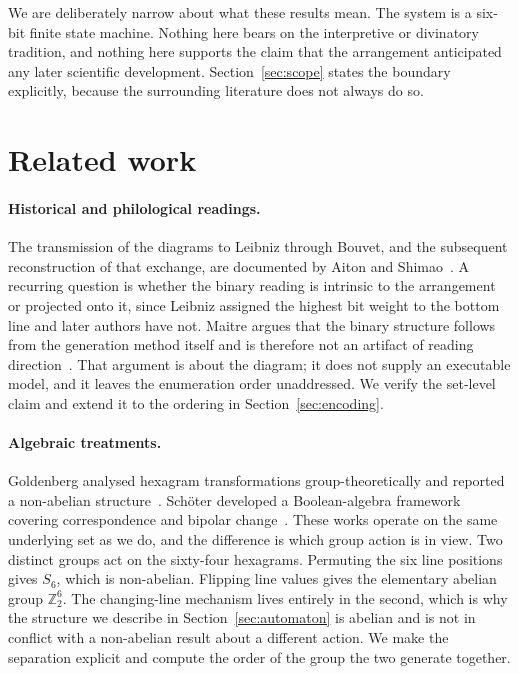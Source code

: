 \documentclass[11pt,a4paper]{article}
\newcommand{\Ztwo}{\mathbb{Z}_2}
\begin{document}
We are deliberately narrow about what these results mean. The system is a
six-bit finite state machine. Nothing here bears on the interpretive or
divinatory tradition, and nothing here supports the claim that the arrangement
anticipated any later scientific development. Section~\ref{sec:scope} states the
boundary explicitly, because the surrounding literature does not always do so.

\section{Related work}

\paragraph{Historical and philological readings.}
The transmission of the diagrams to Leibniz through Bouvet, and the subsequent
reconstruction of that exchange, are documented by Aiton and
Shimao~\cite{aiton1981gorai}. A recurring question is whether the binary reading
is intrinsic to the arrangement or projected onto it, since Leibniz assigned the
highest bit weight to the bottom line and later authors have not. Maitre argues
that the binary structure follows from the generation method itself and is
therefore not an artifact of reading direction~\cite{maitre2023fuxi}. That
argument is about the diagram; it does not supply an executable model, and it
leaves the enumeration order unaddressed. We verify the set-level claim and
extend it to the ordering in Section~\ref{sec:encoding}.

\paragraph{Algebraic treatments.}
Goldenberg analysed hexagram transformations group-theoretically and reported a
non-abelian structure~\cite{goldenberg1975algebra}. Sch\"oter developed a
Boolean-algebra framework covering correspondence and bipolar
change~\cite{schoter1998boolean,schoter2008bipolar}. These works operate on the
same underlying set as we do, and the difference is which group action is in
view. Two distinct groups act on the sixty-four hexagrams. Permuting the six
line positions gives $S_6$, which is non-abelian. Flipping line values gives the
elementary abelian group $\Ztwo^6$. The changing-line mechanism lives entirely
in the second, which is why the structure we describe in
Section~\ref{sec:automaton} is abelian and is not in conflict with a non-abelian
result about a different action. We make the separation explicit and compute the
order of the group the two generate together.
\end{document}
